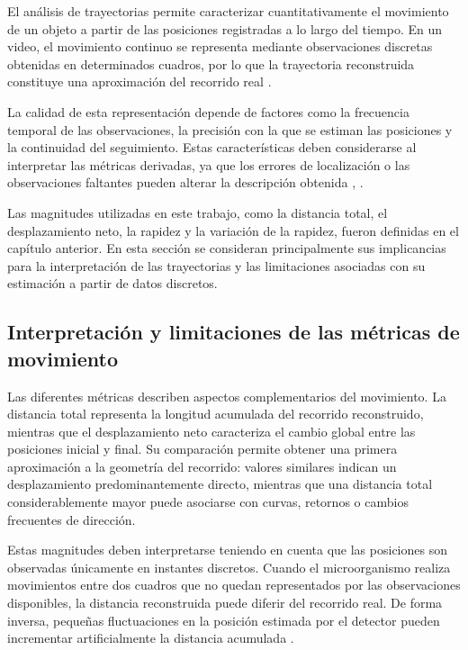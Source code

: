 El análisis de trayectorias permite caracterizar cuantitativamente el movimiento de un objeto a partir de las posiciones registradas a lo largo del tiempo. En un video, el movimiento continuo se representa mediante observaciones discretas obtenidas en determinados cuadros, por lo que la trayectoria reconstruida constituye una aproximación del recorrido real \cite{edelhoff2016}.

La calidad de esta representación depende de factores como la frecuencia temporal de las observaciones, la precisión con la que se estiman las posiciones y la continuidad del seguimiento. Estas características deben considerarse al interpretar las métricas derivadas, ya que los errores de localización o las observaciones faltantes pueden alterar la descripción obtenida \cite{edelhoff2016}, \cite{noonan2019}.

Las magnitudes utilizadas en este trabajo, como la distancia total, el desplazamiento neto, la rapidez y la variación de la rapidez, fueron definidas en el capítulo anterior. En esta sección se consideran principalmente sus implicancias para la interpretación de las trayectorias y las limitaciones asociadas con su estimación a partir de datos discretos.

\subsection{Interpretación y limitaciones de las métricas de movimiento}

Las diferentes métricas describen aspectos complementarios del movimiento. La distancia total representa la longitud acumulada del recorrido reconstruido, mientras que el desplazamiento neto caracteriza el cambio global entre las posiciones inicial y final. Su comparación permite obtener una primera aproximación a la geometría del recorrido: valores similares indican un desplazamiento predominantemente directo, mientras que una distancia total considerablemente mayor puede asociarse con curvas, retornos o cambios frecuentes de dirección.

Estas magnitudes deben interpretarse teniendo en cuenta que las posiciones son observadas únicamente en instantes discretos. Cuando el microorganismo realiza movimientos entre dos cuadros que no quedan representados por las observaciones disponibles, la distancia reconstruida puede diferir del recorrido real. De forma inversa, pequeñas fluctuaciones en la posición estimada por el detector pueden incrementar artificialmente la distancia acumulada \cite{noonan2019}.

